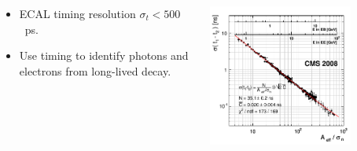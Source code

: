 \documentclass{beamer}
\begin{document}
\begin{frame}
\begin{minipage}{0.8\paperwidth}
\begin{itemize}
  \begin{columns}
    \begin{column}{0.5\textwidth} 
           \begin{itemize}
             \item ECAL timing resolution $\sigma_{t} < 500$~ps.
             \item Use timing to identify photons and electrons from long-lived decay.
           \end{itemize}
     \end{column}%
     \begin{column}{0.6\textwidth}
       \includegraphics[width=0.75\textwidth]{THESISPLOTS/ECAL_Timing_Resolution.png}        
     \end{column} 
   \end{columns} 
     
  \end{itemize}
\end{minipage}
 
\end{frame}
\end{document}
